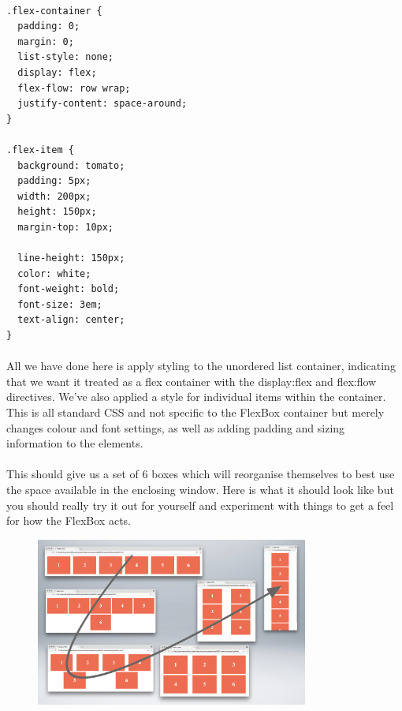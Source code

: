 \begin{lstlisting}

.flex-container {
  padding: 0;
  margin: 0;
  list-style: none;
  display: flex;
  flex-flow: row wrap;
  justify-content: space-around;
}

.flex-item {
  background: tomato;
  padding: 5px;
  width: 200px;
  height: 150px;
  margin-top: 10px;
  
  line-height: 150px;
  color: white;
  font-weight: bold;
  font-size: 3em;
  text-align: center;
}
\end{lstlisting}

\paragraph{} All we have done here is apply styling to the unordered list container, indicating that we want it treated as a flex container with the display:flex and flex:flow directives. We've also applied a style for individual items within the container. This is all standard CSS and not specific to the FlexBox container but merely changes colour and font settings, as well as adding padding and sizing information to the elements.
\paragraph{} This should give us a set of 6 boxes which will reorganise themselves to best use the space available in the enclosing window. Here is what it should look like but you should really try it out for yourself and experiment with things to get a feel for how the FlexBox acts.


\begin{figure}[H]
\centering
\includegraphics[width=0.8\textwidth]{figures/flexbox-resizing-example}
\label{fig:flexbox-resizing-example}
\caption{}
\end{figure}




